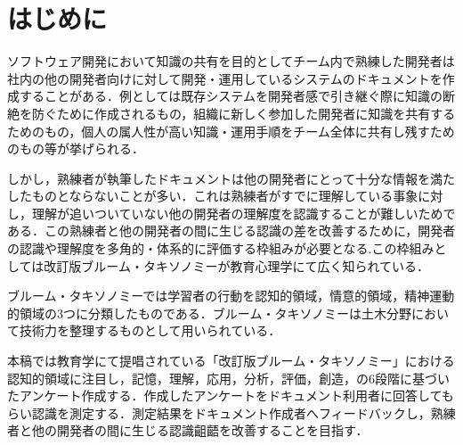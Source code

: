 \section{はじめに}
ソフトウェア開発において知識の共有を目的としてチーム内で熟練した開発者は社内の他の開発者向けに対して開発・運用しているシステムのドキュメントを作成することがある．例としては既存システムを開発者感で引き継ぐ際に知識の断絶を防ぐために作成されるもの，組織に新しく参加した開発者に知識を共有するためのもの，個人の属人性が高い知識・運用手順をチーム全体に共有し残すためのもの等が挙げられる．

しかし，熟練者が執筆したドキュメントは他の開発者にとって十分な情報を満たしたものとならないことが多い．これは熟練者がすでに理解している事象に対し，理解が追いついていない他の開発者の理解度を認識することが難しいためである．この熟練者と他の開発者の間に生じる認識の差を改善するために，開発者の認識や理解度を多角的・体系的に評価する枠組みが必要となる.この枠組みとしては改訂版ブルーム・タキソノミーが教育心理学にて広く知られている\cite{bib:nakao}．

ブルーム・タキソノミーでは学習者の行動を認知的領域，情意的領域，精神運動的領域の3つに分類したものである．ブルーム・タキソノミーは土木分野において技術力を整理するものとして用いられている．

本稿では教育学にて提唱されている「改訂版ブルーム・タキソノミー」における認知的領域に注目し，記憶，理解，応用，分析，評価，創造，の6段階に基づいたアンケート作成する．作成したアンケートをドキュメント利用者に回答してもらい認識を測定する．測定結果をドキュメント作成者へフィードバックし，熟練者と他の開発者の間に生じる認識齟齬を改善することを目指す．
